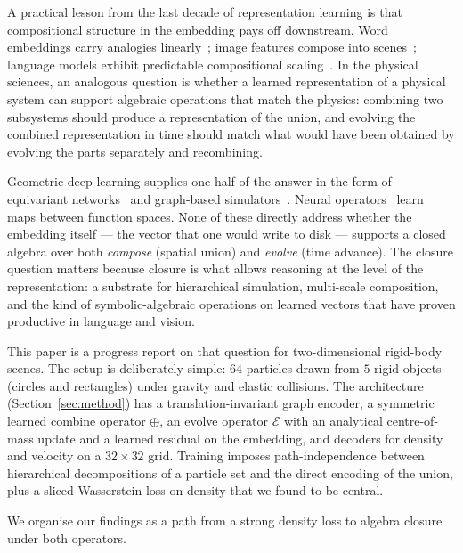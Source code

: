 \documentclass[11pt]{article}
\newcommand{\combine}{\oplus}
\newcommand{\evolve}{\mathcal{E}}
\begin{document}
A practical lesson from the last decade of representation learning is that compositional structure in the embedding pays off downstream. Word embeddings carry analogies linearly~\cite{mikolov2013word2vec}; image features compose into scenes~\cite{deng2009imagenet}; language models exhibit predictable compositional scaling~\cite{kaplan2020scaling}. In the physical sciences, an analogous question is whether a learned representation of a physical system can support algebraic operations that match the physics: combining two subsystems should produce a representation of the union, and evolving the combined representation in time should match what would have been obtained by evolving the parts separately and recombining.

Geometric deep learning supplies one half of the answer in the form of equivariant networks~\cite{cohen2016group, thomas2018tensorfield, satorras2021egnn} and graph-based simulators~\cite{battaglia2018graphnets, sanchez2020learning, bronstein2021geometric}. Neural operators~\cite{li2021fno, kovachki2023fno} learn maps between function spaces. None of these directly address whether the embedding itself --- the vector that one would write to disk --- supports a closed algebra over both \emph{compose} (spatial union) and \emph{evolve} (time advance). The closure question matters because closure is what allows reasoning at the level of the representation: a substrate for hierarchical simulation, multi-scale composition, and the kind of symbolic-algebraic operations on learned vectors that have proven productive in language and vision.

This paper is a progress report on that question for two-dimensional rigid-body scenes. The setup is deliberately simple: $64$ particles drawn from $5$ rigid objects (circles and rectangles) under gravity and elastic collisions. The architecture (Section~\ref{sec:method}) has a translation-invariant graph encoder, a symmetric learned combine operator $\combine$, an evolve operator $\evolve$ with an analytical centre-of-mass update and a learned residual on the embedding, and decoders for density and velocity on a $32 \times 32$ grid. Training imposes path-independence between hierarchical decompositions of a particle set and the direct encoding of the union, plus a sliced-Wasserstein loss on density that we found to be central.

We organise our findings as a path from a strong density loss to algebra closure under both operators.
\end{document}
